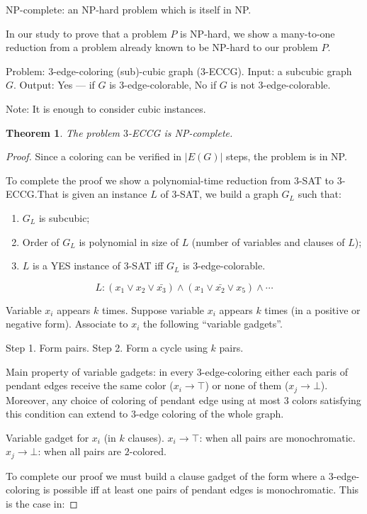 \documentclass[12pt,a4paper]{article}
\newtheorem{theorem}{Theorem}
\begin{document}
NP-complete: an NP-hard problem which is itself in NP.\@

In our study to prove that a problem \(P\) is NP-hard, we show a many-to-one
reduction from a problem already known to be NP-hard to our problem \(P\).

Problem: \(3\)-edge-coloring (sub)-cubic graph (\(3\)-ECCG).
Input: a subcubic graph \(G\).
Output: Yes --- if \(G\) is \(3\)-edge-colorable, No if \(G\) is not
\(3\)-edge-colorable.

Note: It is enough to consider cubic instances.

\begin{theorem}
  The problem \(3\)-ECCG is NP-complete.
\end{theorem}

\begin{proof}
  Since a coloring can be verified in \(|E(G)|\) steps, the problem is in NP.\@

  To complete the proof we show a polynomial-time reduction from \(3\)-SAT to
  \(3\)-ECCG.\@ That is given an instance \(L\) of \(3\)-SAT, we build a graph
  \(G_L\) such that:

  \begin{enumerate}
  \item \(G_L\) is subcubic;
  \item Order of \(G_L\) is polynomial in size of \(L\) (number of variables and
    clauses of \(L\));
  \item \(L\) is a YES instance of \(3\)-SAT iff \(G_L\) is
    \(3\)-edge-colorable.
  \end{enumerate}

  \[L: (x_1 \vee x_2 \vee \bar{x_3}) \wedge (x_1 \vee \bar{x_2} \vee x_5)
    \wedge \cdots\]

  Variable \(x_i\) appears \(k\) times. Suppose variable \(x_i\) appears \(k\)
  times (in a positive or negative form).  Associate to \(x_i\) the following
  \enquote{variable gadgets}.

  Step 1. Form pairs.
  Step 2. Form a cycle using \(k\) pairs.


  Main property of variable gadgets: in every \(3\)-edge-coloring either each
  paris of pendant edges receive the same color (\(x_i \to \top\)) or none of
  them (\(x_j \to \bot\)).  Moreover, any choice of coloring of pendant edge
  using at most \(3\) colors satisfying this condition can extend to \(3\)-edge
  coloring of the whole graph.

  Variable gadget for \(x_i\) (in \(k\) clauses).
  \(x_i \to \top\): when all pairs are monochromatic.
  \(x_j \to \bot\): when all pairs are \(2\)-colored.

  To complete our proof we must build a clause gadget of the form where a
  \(3\)-edge-coloring is possible iff at least one pairs of pendant edges is
  monochromatic. This is the case in:
\end{proof}
\end{document}
